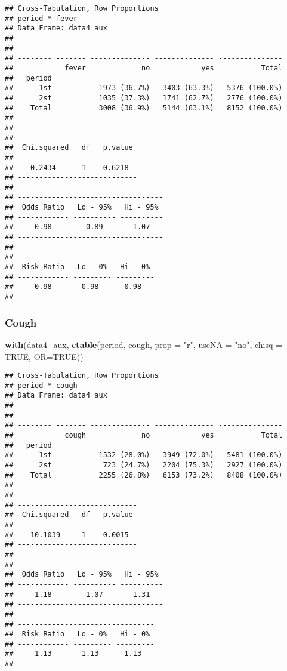 \documentclass[
]{article}
\newenvironment{Shaded}{\begin{snugshade}}{\end{snugshade}}
\newcommand{\DataTypeTok}[1]{\textcolor[rgb]{0.13,0.29,0.53}{#1}}
\newcommand{\KeywordTok}[1]{\textcolor[rgb]{0.13,0.29,0.53}{\textbf{#1}}}
\newcommand{\NormalTok}[1]{#1}
\newcommand{\OtherTok}[1]{\textcolor[rgb]{0.56,0.35,0.01}{#1}}
\newcommand{\StringTok}[1]{\textcolor[rgb]{0.31,0.60,0.02}{#1}}
\begin{document}
\begin{verbatim}
## Cross-Tabulation, Row Proportions  
## period * fever  
## Data Frame: data4_aux  
## 
## 
## -------- ------- -------------- -------------- ---------------
##            fever             no            yes           Total
##   period                                                      
##      1st           1973 (36.7%)   3403 (63.3%)   5376 (100.0%)
##      2st           1035 (37.3%)   1741 (62.7%)   2776 (100.0%)
##    Total           3008 (36.9%)   5144 (63.1%)   8152 (100.0%)
## -------- ------- -------------- -------------- ---------------
## 
## ----------------------------
##  Chi.squared   df   p.value 
## ------------- ---- ---------
##    0.2434      1    0.6218  
## ----------------------------
## 
## ----------------------------------
##  Odds Ratio   Lo - 95%   Hi - 95% 
## ------------ ---------- ----------
##     0.98        0.89       1.07   
## ----------------------------------
## 
## --------------------------------
##  Risk Ratio   Lo - 0%   Hi - 0% 
## ------------ --------- ---------
##     0.98       0.98      0.98   
## --------------------------------
\end{verbatim}

\hypertarget{cough-2}{%
\subsubsection{Cough}\label{cough-2}}

\begin{Shaded}
\begin{Highlighting}[]
\KeywordTok{with}\NormalTok{(data4_aux, }\KeywordTok{ctable}\NormalTok{(period, cough, }\DataTypeTok{prop =} \StringTok{"r"}\NormalTok{, }\DataTypeTok{useNA =} \StringTok{"no"}\NormalTok{, }\DataTypeTok{chisq =} \OtherTok{TRUE}\NormalTok{, }\DataTypeTok{OR=}\OtherTok{TRUE}\NormalTok{))}
\end{Highlighting}
\end{Shaded}

\begin{verbatim}
## Cross-Tabulation, Row Proportions  
## period * cough  
## Data Frame: data4_aux  
## 
## 
## -------- ------- -------------- -------------- ---------------
##            cough             no            yes           Total
##   period                                                      
##      1st           1532 (28.0%)   3949 (72.0%)   5481 (100.0%)
##      2st            723 (24.7%)   2204 (75.3%)   2927 (100.0%)
##    Total           2255 (26.8%)   6153 (73.2%)   8408 (100.0%)
## -------- ------- -------------- -------------- ---------------
## 
## ----------------------------
##  Chi.squared   df   p.value 
## ------------- ---- ---------
##    10.1039     1    0.0015  
## ----------------------------
## 
## ----------------------------------
##  Odds Ratio   Lo - 95%   Hi - 95% 
## ------------ ---------- ----------
##     1.18        1.07       1.31   
## ----------------------------------
## 
## --------------------------------
##  Risk Ratio   Lo - 0%   Hi - 0% 
## ------------ --------- ---------
##     1.13       1.13      1.13   
## --------------------------------
\end{verbatim}
\end{document}

